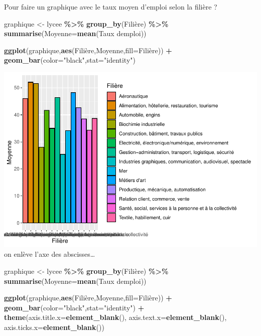 \documentclass[
]{book}
\newenvironment{Shaded}{\begin{snugshade}}{\end{snugshade}}
\newcommand{\AttributeTok}[1]{\textcolor[rgb]{0.13,0.29,0.53}{#1}}
\newcommand{\FunctionTok}[1]{\textcolor[rgb]{0.13,0.29,0.53}{\textbf{#1}}}
\newcommand{\NormalTok}[1]{#1}
\newcommand{\OtherTok}[1]{\textcolor[rgb]{0.56,0.35,0.01}{#1}}
\newcommand{\SpecialCharTok}[1]{\textcolor[rgb]{0.81,0.36,0.00}{\textbf{#1}}}
\newcommand{\StringTok}[1]{\textcolor[rgb]{0.31,0.60,0.02}{#1}}
\begin{document}
Pour faire un graphique avec le taux moyen d'emploi selon la filière ?

\begin{Shaded}
\begin{Highlighting}[]
\NormalTok{graphique }\OtherTok{\textless{}{-}}\NormalTok{ lycee }\SpecialCharTok{\%\textgreater{}\%} \FunctionTok{group\_by}\NormalTok{(Filière) }\SpecialCharTok{\%\textgreater{}\%} 
  \FunctionTok{summarise}\NormalTok{(}\AttributeTok{Moyenne=}\FunctionTok{mean}\NormalTok{(}\StringTok{\textasciigrave{}}\AttributeTok{Taux d\textquotesingle{}emploi}\StringTok{\textasciigrave{}}\NormalTok{))}

\FunctionTok{ggplot}\NormalTok{(graphique,}\FunctionTok{aes}\NormalTok{(Filière,Moyenne,}\AttributeTok{fill=}\NormalTok{Filière)) }\SpecialCharTok{+} \FunctionTok{geom\_bar}\NormalTok{(}\AttributeTok{color=}\StringTok{"black"}\NormalTok{,}\AttributeTok{stat=}\StringTok{"identity"}\NormalTok{)}
\end{Highlighting}
\end{Shaded}

\includegraphics{_main_files/figure-latex/lycee10-1.pdf}
on enlève l'axe des abscisses\ldots{}

\begin{Shaded}
\begin{Highlighting}[]
\NormalTok{graphique }\OtherTok{\textless{}{-}}\NormalTok{ lycee }\SpecialCharTok{\%\textgreater{}\%} \FunctionTok{group\_by}\NormalTok{(Filière) }\SpecialCharTok{\%\textgreater{}\%} 
  \FunctionTok{summarise}\NormalTok{(}\AttributeTok{Moyenne=}\FunctionTok{mean}\NormalTok{(}\StringTok{\textasciigrave{}}\AttributeTok{Taux d\textquotesingle{}emploi}\StringTok{\textasciigrave{}}\NormalTok{))}

\FunctionTok{ggplot}\NormalTok{(graphique,}\FunctionTok{aes}\NormalTok{(Filière,Moyenne,}\AttributeTok{fill=}\NormalTok{Filière)) }\SpecialCharTok{+} \FunctionTok{geom\_bar}\NormalTok{(}\AttributeTok{color=}\StringTok{"black"}\NormalTok{,}\AttributeTok{stat=}\StringTok{"identity"}\NormalTok{) }\SpecialCharTok{+}
   \FunctionTok{theme}\NormalTok{(}\AttributeTok{axis.title.x=}\FunctionTok{element\_blank}\NormalTok{(),}
        \AttributeTok{axis.text.x=}\FunctionTok{element\_blank}\NormalTok{(),}
        \AttributeTok{axis.ticks.x=}\FunctionTok{element\_blank}\NormalTok{())}
\end{Highlighting}
\end{Shaded}
\end{document}
